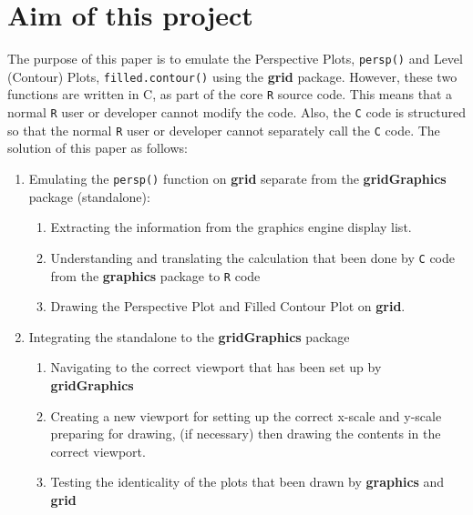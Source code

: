 \documentclass[11pt,twoside]{report}
\begin{document}
\newpage
\section{Aim of this project}
The purpose of this paper is to emulate the Perspective Plots, \texttt{persp()} and Level (Contour) Plots, \texttt{filled.contour()} using the \textbf{grid} package. However, these two functions are written in C, as part of the core \texttt{R} source code. This means that a normal \texttt{R} user or developer cannot modify the code. Also, the \texttt{C} code is structured so that the normal \texttt{R} user or developer cannot separately call the \texttt{C} code. The solution of this paper as follows: 

\begin{enumerate}
	\item Emulating the \texttt{persp()} function on \textbf{grid} separate from the \textbf{gridGraphics} package (standalone):
	\begin{enumerate}
		\item Extracting the information from the graphics engine display list.
		\item Understanding and translating the calculation that been done by \texttt{C} code from the \textbf{graphics} package to \texttt{R} code
		\item Drawing the Perspective Plot and Filled Contour Plot on \textbf{grid}.
	\end{enumerate}
	\item Integrating the standalone to the \textbf{gridGraphics} package
		\begin{enumerate}
			\item Navigating to the correct viewport that has been set up by \textbf{gridGraphics}
			\item Creating a new viewport for setting up the correct x-scale and y-scale preparing for drawing, (if necessary) then drawing the contents in the correct viewport.
			\item Testing the identicality of the plots that been drawn by \textbf{graphics} and \textbf{grid}
		\end{enumerate}
\end{enumerate}



\end{document}
